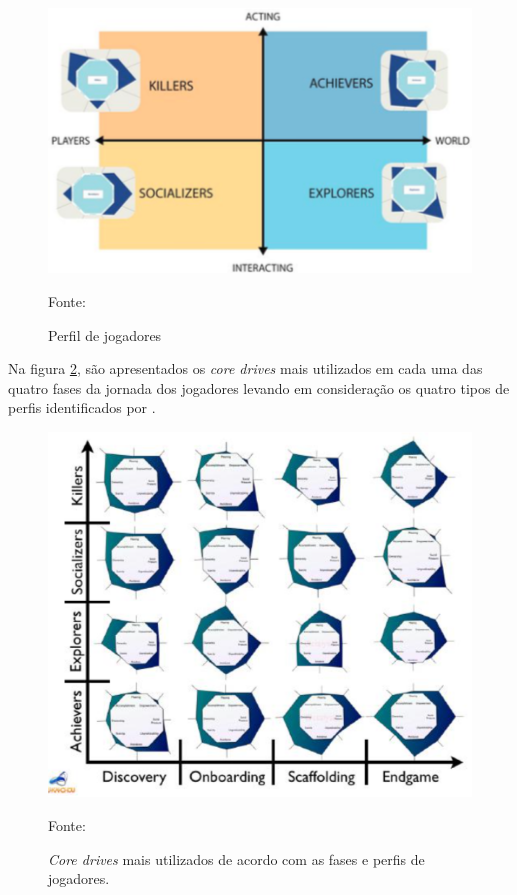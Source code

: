 \begin{figure}[h]
	\centering
	\includegraphics[keepaspectratio=true,scale=0.6]{figuras/perfiljogadores.png}
	\caption{Perfil de jogadores}
	Fonte: \cite{chou2017actionable}
	\label{perfiljogadores}
\end{figure}

Na figura \ref{nivel3}, são apresentados os \textit{core drives} mais utilizados em cada uma das quatro fases da jornada dos jogadores levando em
consideração os quatro tipos de perfis identificados por .

\begin{figure}[h]
	\centering
	\includegraphics[keepaspectratio=true,scale=0.5]{figuras/nivel3.png}
	\caption{\textit{Core drives} mais utilizados de acordo com as fases e perfis de jogadores.}
	Fonte: \cite{chou2017actionable}
	\label{nivel3}
\end{figure}

